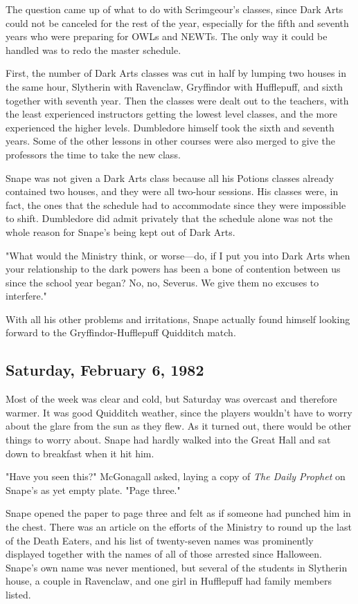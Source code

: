 The question came up of what to do with Scrimgeour's classes, since Dark Arts could not be canceled for the rest of the year, especially for the fifth and seventh years who were preparing for OWLs and NEWTs. The only way it could be handled was to redo the master schedule.

First, the number of Dark Arts classes was cut in half by lumping two houses in the same hour, Slytherin with Ravenclaw, Gryffindor with Hufflepuff, and sixth together with seventh year. Then the classes were dealt out to the teachers, with the least experienced instructors getting the lowest level classes, and the more experienced the higher levels. Dumbledore himself took the sixth and seventh years. Some of the other lessons in other courses were also merged to give the professors the time to take the new class.

Snape was not given a Dark Arts class because all his Potions classes already contained two houses, and they were all two-hour sessions. His classes were, in fact, the ones that the schedule had to accommodate since they were impossible to shift. Dumbledore did admit privately that the schedule alone was not the whole reason for Snape's being kept out of Dark Arts.

"What would the Ministry think, or worse—do, if I put you into Dark Arts when your relationship to the dark powers has been a bone of contention between us since the school year began? No, no, Severus. We give them no excuses to interfere."

With all his other problems and irritations, Snape actually found himself looking forward to the Gryffindor-Hufflepuff Quidditch match.

\subsection{Saturday, February 6, 1982}

Most of the week was clear and cold, but Saturday was overcast and therefore warmer. It was good Quidditch weather, since the players wouldn't have to worry about the glare from the sun as they flew. As it turned out, there would be other things to worry about. Snape had hardly walked into the Great Hall and sat down to breakfast when it hit him.

"Have you seen this?" McGonagall asked, laying a copy of \emph{The Daily Prophet} on Snape's as yet empty plate. "Page three."

Snape opened the paper to page three and felt as if someone had punched him in the chest. There was an article on the efforts of the Ministry to round up the last of the Death Eaters, and his list of twenty-seven names was prominently displayed together with the names of all of those arrested since Halloween. Snape's own name was never mentioned, but several of the students in Slytherin house, a couple in Ravenclaw, and one girl in Hufflepuff had family members listed.

